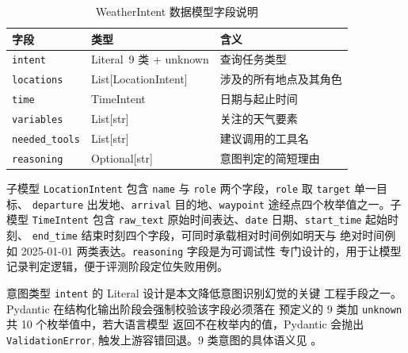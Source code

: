 \begin{table}[!ht]
    \centering
    \caption{WeatherIntent 数据模型字段说明}
    \label{tab:weather-intent-schema}
    \song\fontsize{9pt}{12pt}\selectfont
    \renewcommand{\arraystretch}{0.95}
    \begin{tabular}{lll}
        \toprule
        字段 & 类型 & 含义 \\
        \midrule
        \texttt{intent} & Literal\ 9 类 + unknown & 查询任务类型 \\
        \texttt{locations} & List[LocationIntent] & 涉及的所有地点及其角色 \\
        \texttt{time} & TimeIntent & 日期与起止时间 \\
        \texttt{variables} & List[str] & 关注的天气要素 \\
        \texttt{needed\_\bk{}tools} & List[str] & 建议调用的工具名 \\
        \texttt{reasoning} & Optional[str] & 意图判定的简短理由 \\
        \bottomrule
    \end{tabular}
\end{table}

子模型 \texttt{LocationIntent} 包含 \texttt{name} 与
\texttt{role} 两个字段，\texttt{role} 取 \texttt{target} 单一目标、
\texttt{departure} 出发地、\texttt{arrival} 目的地、\texttt{waypoint}
途经点四个枚举值之一。子模型 \texttt{TimeIntent} 包含 \texttt{raw\_\bk{}text}
原始时间表达、\texttt{date} 日期、\texttt{start\_\bk{}time} 起始时刻、
\texttt{end\_\bk{}time} 结束时刻四个字段，可同时承载相对时间例如明天与
绝对时间例如 2025-01-01 两类表达。\texttt{reasoning} 字段是为可调试性
专门设计的，用于让模型记录判定逻辑，便于评测阶段定位失败用例。

意图类型 \texttt{intent} 的 Literal 设计是本文降低意图识别幻觉的关键
工程手段之一。Pydantic 在结构化输出阶段会强制校验该字段必须落在
预定义的 9 类加 \texttt{unknown} 共 10 个枚举值中，若大语言模型
返回不在枚举内的值，Pydantic 会抛出 \texttt{ValidationError},
触发上游容错回退。9 类意图的具体语义见 。


